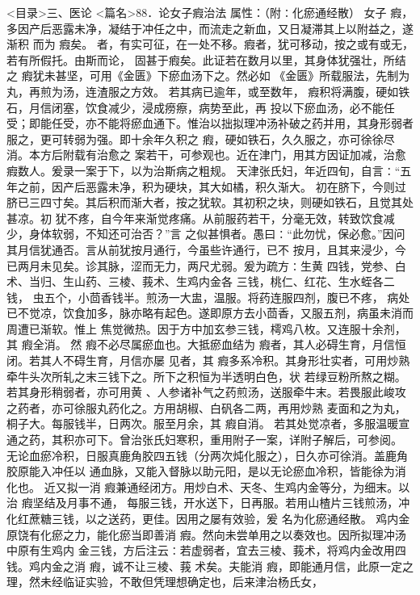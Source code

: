 \documentclass[a4paper,12pt,UTF8,twoside]{ctexbook}
\begin{document}
<目录>三、医论
<篇名>88．论女子瘕治法
属性：（附∶化瘀通经散） 
女子 瘕，多因产后恶露未净，凝结于冲任之中，而流走之新血，又日凝滞其上以附益之，遂渐积 
而为 瘕矣。 者，有实可征，在一处不移。瘕者，犹可移动，按之或有或无，若有所假托。由斯而论， 
固甚于瘕矣。此证若在数月以里，其身体犹强壮，所结之 瘕犹未甚坚，可用《金匮》下瘀血汤下之。然必如 
《金匮》所载服法，先制为丸，再煎为汤，连渣服之方效。 
若其病已逾年，或至数年， 瘕积将满腹，硬如铁石，月信闭塞，饮食减少，浸成痨瘵，病势至此，再 
投以下瘀血汤，必不能任受；即能任受，亦不能将瘀血通下。惟治以拙拟理冲汤补破之药并用，其身形弱者 
服之，更可转弱为强。即十余年久积之 瘕，硬如铁石，久久服之，亦可徐徐尽消。本方后附载有治愈之 
案若干，可参观也。近在津门，用其方因证加减，治愈 瘕数人。爰录一案于下，以为治斯病之粗规。 
天津张氏妇，年近四旬，自言∶“五年之前，因产后恶露未净，积为硬块，其大如橘，积久渐大。 
初在脐下，今则过脐已三四寸矣。其后积而渐大者，按之犹软。其初积之块，则硬如铁石，且觉其处甚凉。初 
犹不疼，自今年来渐觉疼痛。从前服药若干，分毫无效，转致饮食减少，身体软弱，不知还可治否？”言 
之似甚惧者。愚曰∶“此勿忧，保必愈。”因问其月信犹通否。言从前犹按月通行，今虽些许通行，已不 
按月，且其来浸少，今已两月未见矣。诊其脉，涩而无力，两尺尤弱。爰为疏方∶生黄 
四钱，党参、白术、当归、生山药、三棱、莪术、生鸡内金各 
三钱，桃仁、红花、生水蛭各二钱， 虫五个，小茴香钱半。煎汤一大盅，温服。将药连服四剂，腹已不疼， 
病处已不觉凉，饮食加多，脉亦略有起色。遂即原方去小茴香，又服五剂，病虽未消而周遭已渐软。惟上 
焦觉微热。因于方中加玄参三钱，樗鸡八枚。又连服十余剂，其 瘕全消。 
然 瘕不必尽属瘀血也。大抵瘀血结为 瘕者，其人必碍生育，月信恒闭。若其人不碍生育，月信亦屡 
见者，其 瘕多系冷积。其身形壮实者，可用炒熟牵牛头次所轧之末三钱下之。所下之积恒为半透明白色，状 
若绿豆粉所熬之糊。若其身形稍弱者，亦可用黄 、人参诸补气之药煎汤，送服牵牛末。若畏服此峻攻 
之药者，亦可徐服丸药化之。方用胡椒、白矾各二两，再用炒熟 
麦面和之为丸，桐子大。每服钱半，日两次。服至月余，其 瘕自消。 
若其处觉凉者，多服温暖宣通之药，其积亦可下。曾治张氏妇寒积，重用附子一案，详附子解后，可参阅。 
无论血瘀冷积，日服真鹿角胶四五钱（分两次炖化服之），日久亦可徐消。盖鹿角胶原能入冲任以 
通血脉，又能入督脉以助元阳，是以无论瘀血冷积，皆能徐为消化也。 
近又拟一消 瘕兼通经闭方。用炒白术、天冬、生鸡内金等分，为细末。以治 瘕坚结及月事不通， 
每服三钱，开水送下，日再服。若用山楂片三钱煎汤，冲化红蔗糖三钱，以之送药，更佳。因用之屡有效验，爰 
名为化瘀通经散。 
鸡内金原饶有化瘀之力，能化瘀当即善消 瘕。然向未尝单用之以奏效也。因所拟理冲汤中原有生鸡内 
金三钱，方后注云∶若虚弱者，宜去三棱、莪术，将鸡内金改用四钱。鸡内金之消 瘕，诚不让三棱、莪 
术矣。夫能消 瘕，即能通月信，此原一定之理，然未经临证实验，不敢但凭理想确定也，后来津治杨氏女， 
\end{document}
